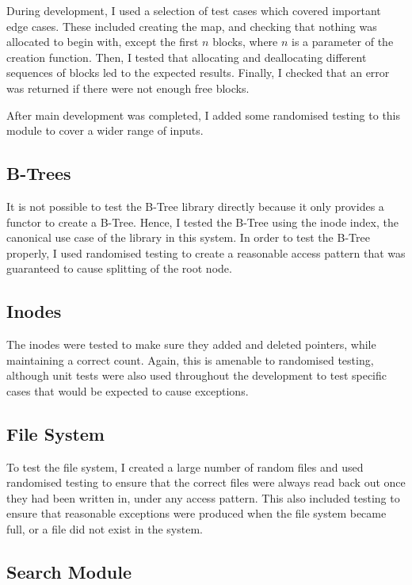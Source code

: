 \documentclass[12pt,a4paper,twoside,openright]{report}
\begin{document}
During development, I used a selection of test cases which covered important edge cases. These included creating the map, and checking that nothing was allocated to begin with, except the first $n$ blocks, where $n$ is a parameter of the creation function. Then, I tested that allocating and deallocating different sequences of blocks led to the expected results. Finally, I checked that an error was returned if there were not enough free blocks.

After main development was completed, I added some randomised testing to this module to cover a wider range of inputs.

\subsection{B-Trees}

It is not possible to test the B-Tree library directly because it only provides a functor to create a B-Tree. Hence, I tested the B-Tree using the inode index, the canonical use case of the library in this system. In order to test the B-Tree properly, I used randomised testing to create a reasonable access pattern that was guaranteed to cause splitting of the root node.

\subsection{Inodes}

The inodes were tested to make sure they  added and deleted pointers, while maintaining a correct count. Again, this is amenable to randomised testing, although unit tests were also used throughout the development to test specific cases that would be expected to cause exceptions.

\subsection{File System}

To test the file system, I created a large number of random files and used randomised testing to ensure that the correct files were always read back out once they had been written in, under any access pattern. This also included testing to ensure that reasonable exceptions were produced when the file system became full, or a file did not exist in the system.

\subsection{Search Module}
\end{document}

